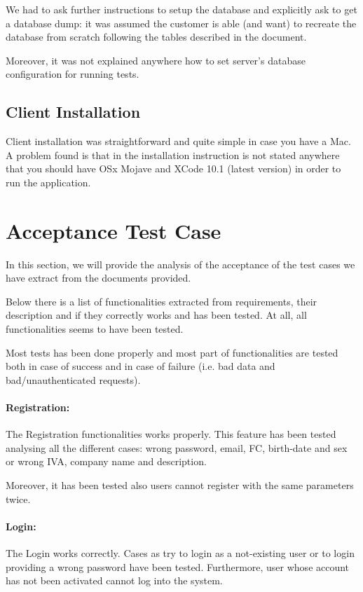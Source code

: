 \documentclass[a4paper]{article}
\begin{document}
We had to ask further instructions to setup the database and explicitly ask to get a database dump: it was assumed the customer is able (and want) to recreate the database from scratch following the tables described in the document.

Moreover, it was not explained anywhere how to set server's database configuration for running tests.

\subsection{Client Installation}
Client installation was straightforward and quite simple in case you have a Mac. A problem found is that in the installation instruction is not stated anywhere that you should have OSx Mojave and XCode 10.1 (latest version) in order to run the application.

\newpage
\section{Acceptance Test Case}
In this section, we will provide the analysis of the acceptance of the test cases we have extract from the documents provided. 

Below there is a list of functionalities extracted from requirements, their description and if they correctly works and has been tested. At all, all functionalities seems to have been tested.

Most tests has been done properly and most part of functionalities are tested both in case of success and in case of failure (i.e. bad data and bad/unauthenticated requests).

\paragraph{Registration:}
The Registration functionalities works properly. This feature has been tested analysing all the different cases: wrong password, email, FC, birth-date and sex or wrong IVA, company name and description.

Moreover, it has been tested also users cannot register with the same parameters twice.

\paragraph{Login:}
The Login works correctly. Cases as try to login as a not-existing user or to login providing a wrong password have been tested. Furthermore, user whose account has not been activated cannot log into the system.
\end{document}
